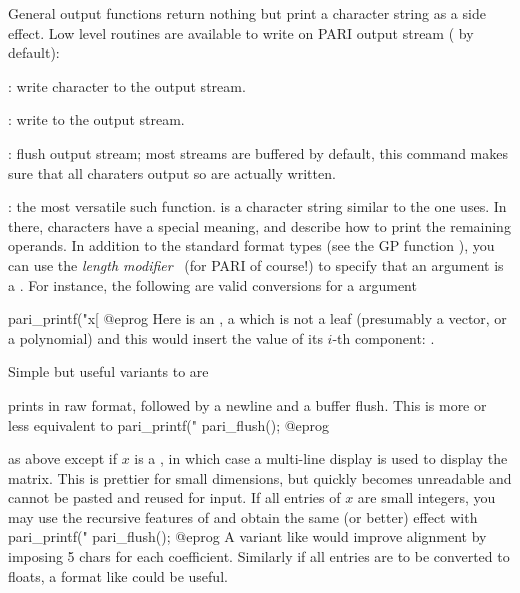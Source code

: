 General output functions return nothing but print a character string as a
side effect. Low level routines are available to write on PARI output stream
 ( by default):

: write character  to the output stream.

: write  to the output stream.

: flush output stream; most streams are buffered by
default, this command makes sure that all charaters output so are actually
written.

: the most versatile such
function.  is a character string similar to the one
 uses. In there, \kbd{\%} characters have a special meaning, and
describe how to print the remaining operands. In addition to the standard
format types (see the GP function ), you can use the \emph{length
modifier}~ (for PARI of course!) to specify that an argument is a
. For instance, the following are valid conversions for a 
argument
\bprog

    pari_printf("x[%
@eprog\noindent
Here  is an ,  a  which is not a leaf
(presumably a vector, or a polynomial) and this would insert the value of its
$i$-th  component: .

\noindent Simple but useful variants to  are

 prints  in raw format, followed by a
newline and a buffer flush. This is more or less equivalent to
\bprog
    pari_printf("%
    pari_flush();
@eprog

 as above except if $x$ is a , in which
case a multi-line display is used to display the matrix. This is prettier for
small dimensions, but quickly becomes unreadable and cannot be pasted and
reused for input. If all entries of $x$ are small integers, you may use the
recursive features of  and obtain the same (or better) effect with
\bprog
    pari_printf("%
    pari_flush();
@eprog\noindent
A variant like  would improve alignment by imposing
5 chars for each coefficient. Similarly if all entries are to be converted to
floats, a format like  could be useful.


